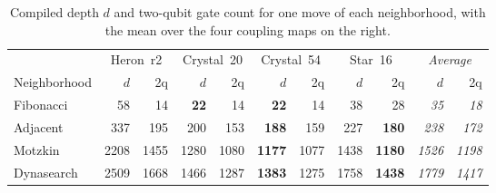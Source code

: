 \documentclass{svproc}
\begin{document}
\begin{table}[htb]
\centering
\caption{Compiled depth $d$ and two-qubit gate count for one move of each
  neighborhood, with the mean over the four coupling maps on the right.}
\label{tab:depth}
\footnotesize
\setlength{\tabcolsep}{3pt}
\begin{tabular*}{\textwidth}{@{\extracolsep{\fill}}lrrrrrrrr@{\hspace{1.2em}}rr@{}}
\toprule
& \multicolumn{2}{c}{Heron~r2} & \multicolumn{2}{c}{Crystal~20}
& \multicolumn{2}{c}{Crystal~54} & \multicolumn{2}{c}{Star~16}
& \multicolumn{2}{c}{\emph{Average}} \\
\cmidrule(lr){2-3}\cmidrule(lr){4-5}\cmidrule(lr){6-7}\cmidrule(lr){8-9}\cmidrule(lr){10-11}
Neighborhood & $d$ & 2q & $d$ & 2q & $d$ & 2q & $d$ & 2q & $d$ & 2q \\
\midrule
Fibonacci  & 58   & 14   & \textbf{22}   & 14   & \textbf{22}   & 14   & 38   & 28            & \emph{35}   & \emph{18} \\
Adjacent   & 337  & 195  & 200  & 153  & \textbf{188}  & 159  & 227  & \textbf{180}  & \emph{238}  & \emph{172} \\
Motzkin    & 2208 & 1455 & 1280 & 1080 & \textbf{1177} & 1077 & 1438 & \textbf{1180} & \emph{1526} & \emph{1198} \\
Dynasearch & 2509 & 1668 & 1466 & 1287 & \textbf{1383} & 1275 & 1758 & \textbf{1438} & \emph{1779} & \emph{1417} \\
\bottomrule
\end{tabular*}
\end{table}
\end{document}
